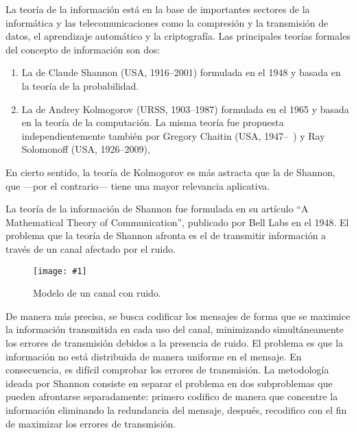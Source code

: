 \documentclass[11pt]{article}
\newcommand{\figscale}[2]{\texttt{[image: \#1]}}
\begin{document}
\begin{center}
\end{center}

\bigskip

La teoría de la información está en la base de importantes sectores de la informática y las telecomunicaciones como la compresión y la transmisión de datos, el aprendizaje automático y la criptografía. Las principales teorías formales del concepto de información son dos:
\begin{enumerate}
\item La de Claude Shannon (USA, 1916--2001) formulada en el 1948 y basada en la teoría de la probabilidad.
\item La de Andrey Kolmogorov (URSS, 1903--1987) formulada en el 1965 y basada en la teoría de la computación. La misma teoría fue propuesta independientemente también por Gregory Chaitin (USA, 1947--\ ) y Ray Solomonoff (USA, 1926--2009), 
\end{enumerate}
En cierto sentido, la teoría de Kolmogorov es más astracta que la de Shannon, que ---por el contrario--- tiene una mayor relevancia aplicativa.


La teoría de la información de Shannon fue formulada en su artículo ``A Mathematical Theory of Communication'', publicado por Bell Labs en el 1948. El problema que la teoría de Shannon afronta es el de transmitir información a través de un canal afectado por el ruido.

\begin{figure}[h]
\begin{center}
\figscale{Images/canale}{0.5}
\end{center}
\caption{
\label{fig:canale}
Modelo de un canal con ruido.
}
\end{figure}

De manera más precisa, se busca codificar los mensajes de forma que se maximice la información transmitida en cada uso del canal, minimizando simultáneamente los errores de transmisión debidos a la presencia de ruido. El problema es que la información no está distribuida de manera uniforme en el mensaje. En consecuencia, es difícil comprobar los errores de transmisión. La metodología ideada por Shannon consiste en separar el problema en dos subproblemas que pueden afrontarse separadamente: primero codifico de manera que concentre la información eliminando la redundancia del mensaje, después, recodifico con el fin de maximizar los errores de transmisión.
\end{document}

